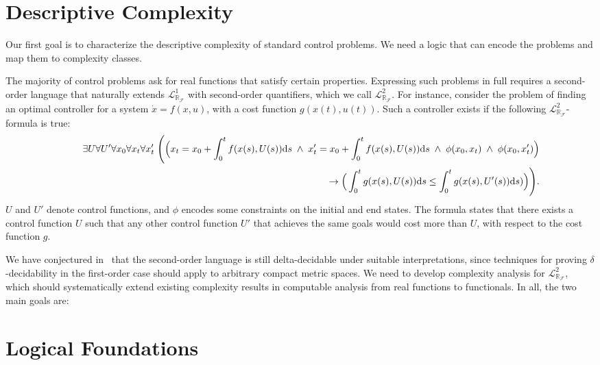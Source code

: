 \documentclass[10pt]{article}
\newcommand{\lrf}{\mathcal{L}_{\mathbb{R}_{\mathcal{F}}}}
\theoremstyle{definition}
\begin{document}
\section{Descriptive Complexity}


Our first goal is to characterize the descriptive complexity of standard control problems. We need a logic that can encode the problems and map them to complexity classes. 

The majority of control problems ask for real functions that satisfy certain properties. Expressing such problems in full requires a second-order language that naturally extends $\lrf^1$ with second-order quantifiers, which we call $\lrf^2$. For instance, consider the problem of finding an optimal controller for a system $\dot x = f({x}, u)$, with a cost function $g(x(t),u(t))$. Such a controller exists if the following $\lrf^2$-formula is true:
\begin{eqnarray*}
& &\exists U \forall U' \forall {x_0}\forall {x_t} \forall {x_t'} \;\Bigg( \Big({x_t} = {x_0} + \int_{0}^t f({x}(s),U(s))\mathrm{d}s \;\wedge\;  x_t' = x_0 + \int_{0}^t f(x(s),U(s))\mathrm{d}s
\;\wedge\; \phi(x_0, x_t) \;\wedge\; \phi(x_0, x_t')\Big)\\
& &\hspace{9.5cm} \rightarrow \Big(\int_0^t g(x(s),U(s))\mathrm{d}s \leq  \int_0^t g(x(s),U'(s))\mathrm{d}s)\Big) \Bigg).
\end{eqnarray*}
$U$ and $U'$ denote control functions, and $\phi$ encodes some constraints on the initial and end states. The formula states that there exists a control function $U$ such that any other control function $U'$ that achieves the same goals would cost more than $U$, with respect to the cost function $g$. 

We have conjectured in~\cite{DBLP:conf/lics/GaoAC12} that the second-order language is still delta-decidable under suitable interpretations, since techniques for proving $\delta$-decidability in the first-order case should apply to arbitrary compact metric spaces. We need to develop complexity analysis for $\lrf^2$, which should systematically extend existing complexity results in computable analysis from real functions to functionals. In all, the two main goals are:

\section{Logical Foundations}
\end{document}

